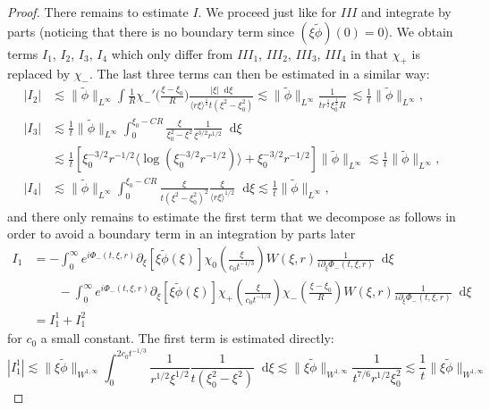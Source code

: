 \documentclass[11 pt]{amsart}
\theoremstyle{definition}
\theoremstyle{remark}
\numberwithin{equation}{section}
\newcommand{\dd}{\mathop{}\!\mathrm{d}}
\begin{document}
\begin{proof}
There remains to estimate $I$. We proceed just like for $III$ and integrate by parts (noticing that there is no boundary term since $(\xi \widetilde{\phi})(0)=0$). We obtain terms $I_1$, $I_2$, $I_3$, $I_4$ which only differ from $III_1$, $III_2$, $III_3$, $III_4$ in that $\chi_+$ is replaced by $\chi_-$. The last three terms can then be estimated in a similar way:
\begin{align*}
|I_{2}| & \lesssim \| \tilde \phi \|_{L^\infty} \int \frac{1}{R} \chi_-' \big( \frac{\xi - \xi_0}{R}\big) \frac{|\xi| \dd\xi}{\langle r \xi\rangle^{\frac 12}t (\xi^2-\xi_0^2)} \lesssim  \| \tilde \phi \|_{L^{\infty}} \frac{1}{t r^{\frac 12}\xi_0^{\frac 12}R} \ \lesssim \frac 1t \| \tilde \phi \|_{L^{\infty}}, \\
|I_3|& \lesssim \frac{1}{t} \| \widetilde{\phi} \|_{L^\infty} \int_0^{\xi_0-CR} \frac{\xi}{\xi_0^2 - \xi^2} \frac{1}{\xi^{3/2} r^{1/2}} \dd\xi \\
& \lesssim \frac{1}{t} \left[  \xi_0^{-3/2} r^{-1/2} \langle \log(\xi_0^{-3/2} r^{-1/2} ) \rangle + \xi_0^{-3/2} r^{-1/2}  \right] \|  \widetilde{\phi} \|_{L^\infty} \lesssim \frac 1t  \| \widetilde{\phi} \|_{L^\infty},\\
 |I_4| & \lesssim \|  \widetilde{\phi} \|_{L^\infty} \int_{0}^{ \xi_0 - CR} \frac{\xi}{t(\xi^2 - \xi_0^2)^2} \frac{\xi}{\langle r\xi \rangle^{1/2}} \dd \xi \lesssim \frac{1}{t} \|  \widetilde{\phi} \|_{L^\infty},
\end{align*}
and there only remains to estimate the first term that we decompose as follows in order to avoid a boundary term in an integration by parts later
\begin{align*}
I_1 & = - \int_0^\infty e^{i \Phi_-(t,\xi,r)} \partial_\xi \left[ \xi \widetilde{\phi}(\xi) \right] \chi_0\left(\frac{\xi}{c_0t^{-1/3}}\right) W(\xi,r) \frac{1}{i \partial_\xi \Phi_-(t,\xi,r)} \dd \xi \\
&\qquad - \int_0^\infty e^{i \Phi_-(t,\xi,r)} \partial_\xi \left[ \xi \widetilde{\phi}(\xi) \right] \chi_+\left(\frac{\xi}{c_0t^{-1/3}}\right) \chi_-\left( \frac{\xi - \xi_0}{R} \right) W(\xi,r) \frac{1}{i \partial_\xi \Phi_-(t,\xi,r)} \dd \xi \\
& = I_1^1+I_1^2
\end{align*}
for $c_0$ a small constant. The first term is estimated directly:
$$
|I_1^1|\lesssim \| \xi \widetilde{\phi}\|_{W^{1,\infty}} \int_0^{2c_0t^{-1/3}} \frac{1}{r^{1/2}\xi^{1/2}} \frac{1}{t(\xi_0^2-\xi^2)} \dd \xi \lesssim \| \xi \widetilde{\phi}\|_{W^{1,\infty}} \frac{1}{t^{7/6}r^{1/2}\xi_0^2} \lesssim \frac{1}{t} \| \xi \widetilde{\phi}\|_{W^{1,\infty}} 
$$
\end{proof}
\end{document}
